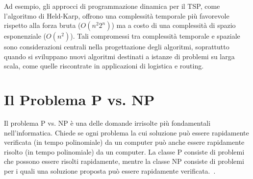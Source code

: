 Ad esempio, gli approcci di programmazione dinamica per il \gls{TSP}, come l'algoritmo di Held-Karp, offrono una complessità temporale più favorevole rispetto alla forza bruta (\(O(n^2 2^n)\)) ma a costo di una complessità di spazio esponenziale (\(O(n^2)\)). Tali compromessi tra complessità temporale e spaziale sono considerazioni centrali nella progettazione degli algoritmi, soprattutto quando si sviluppano nuovi algoritmi destinati a istanze di problemi su larga scala, come quelle riscontrate in applicazioni di logistica e routing.

\section{Il Problema \gls{P} vs. \gls{NP} }

Il problema \gls{P} vs. \gls{NP} è una delle domande irrisolte più fondamentali nell'informatica. Chiede se ogni problema la cui soluzione può essere rapidamente verificata (in tempo polinomiale) da un computer può anche essere rapidamente risolto (in tempo polinomiale) da un computer. La classe \gls{P} consiste di problemi che possono essere risolti rapidamente, mentre la classe \gls{NP} consiste di problemi per i quali una soluzione proposta può essere rapidamente verificata.~\cite{PvsNP}.


